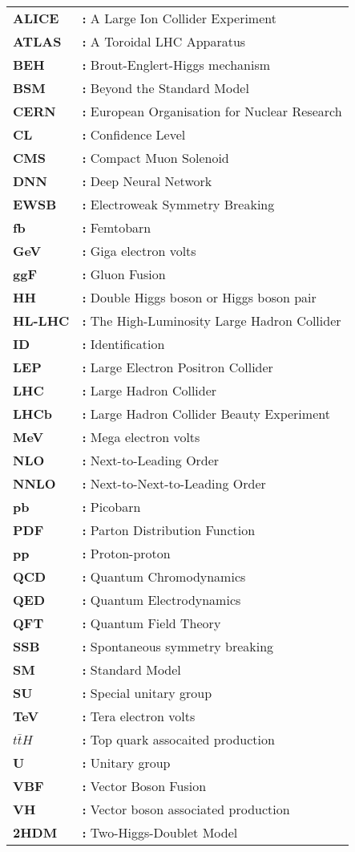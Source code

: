 \begin{tabular}{@{}p{2cm}l}
{\bf ALICE} & {\bf:} A Large Ion Collider Experiment\\
{\bf ATLAS} & {\bf:} A Toroidal LHC Apparatus\\
{\bf BEH} & {\bf:} Brout-Englert-Higgs mechanism\\
{\bf BSM} & {\bf:} Beyond the Standard Model\\
{\bf CERN} & {\bf:} European Organisation for Nuclear Research\\
{\bf CL} & {\bf:} Confidence Level\\
{\bf CMS} & {\bf:} Compact Muon Solenoid\\
{\bf DNN} & {\bf:} Deep Neural Network\\
{\bf EWSB} & {\bf:} Electroweak Symmetry Breaking\\
{\bf fb} & {\bf:} Femtobarn\\
{\bf GeV} & {\bf:} Giga electron volts\\
{\bf ggF} & {\bf:} Gluon Fusion\\
{\bf HH} & {\bf:} Double Higgs boson or Higgs boson pair\\
{\bf HL-LHC} & {\bf:} The High-Luminosity Large Hadron Collider\\
{\bf ID} & {\bf:} Identification\\
{\bf LEP} & {\bf:} Large Electron Positron Collider\\
{\bf LHC} & {\bf:} Large Hadron Collider\\
{\bf LHCb} & {\bf:} Large Hadron Collider Beauty Experiment\\
{\bf MeV} & {\bf:} Mega electron volts\\
{\bf NLO} & {\bf:} Next-to-Leading Order\\
{\bf NNLO} & {\bf:} Next-to-Next-to-Leading Order\\
{\bf pb} & {\bf:} Picobarn\\
{\bf PDF} & {\bf:} Parton Distribution Function\\
{\bf pp} & {\bf:} Proton-proton\\
{\bf QCD} & {\bf:} Quantum Chromodynamics\\
{\bf QED} & {\bf:} Quantum Electrodynamics\\
{\bf QFT} & {\bf:} Quantum Field Theory\\
{\bf SSB} & {\bf:} Spontaneous symmetry breaking\\
{\bf SM} & {\bf:} Standard Model\\
{\bf SU} & {\bf:} Special unitary group\\
{\bf TeV} & {\bf:} Tera electron volts\\
{\bf $t\bar tH$} & {\bf:} Top quark assocaited production\\
{\bf U} & {\bf:} Unitary group\\
{\bf VBF} & {\bf:} Vector Boson Fusion\\
{\bf VH} & {\bf:} Vector boson associated production\\
{\bf 2HDM} & {\bf:} Two-Higgs-Doublet Model\\
\end{tabular}
